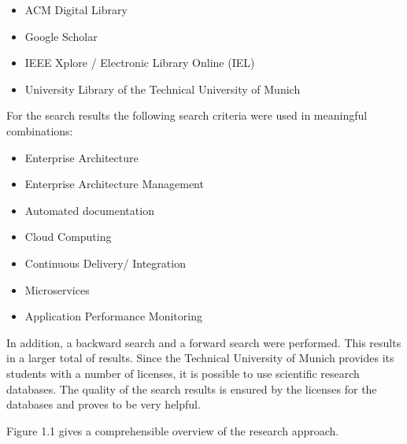 \begin{itemize}
    \item ACM Digital Library
    \item Google Scholar
    \item IEEE Xplore / Electronic Library Online (IEL)
    \item University Library of the Technical University of Munich
\end{itemize}

For the search results the following search criteria were used in meaningful combinations:

\begin{itemize}
    \item Enterprise Architecture
    \item Enterprise Architecture Management
    \item Automated documentation
    \item Cloud Computing
    \item Continuous Delivery/ Integration
    \item Microservices
    \item Application Performance Monitoring
    
\end{itemize}

In addition, a backward search and a forward search were performed. This results in a larger total of results. Since the Technical University of Munich provides its students with a number of licenses, it is possible to use scientific research databases. The quality of the search results is ensured by the licenses for the databases and proves to be very helpful.

Figure 1.1 gives a comprehensible overview of the research approach.